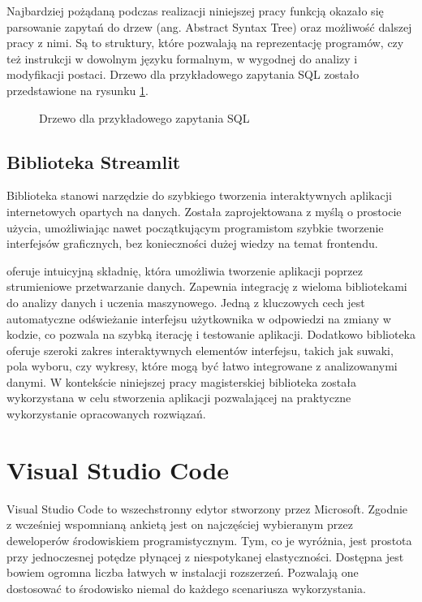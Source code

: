 Najbardziej pożądaną podczas realizacji niniejszej pracy funkcją okazało się parsowanie zapytań do drzew  (ang. Abstract Syntax Tree) oraz możliwość dalszej pracy z nimi. Są to struktury, które pozwalają na reprezentację programów, czy też instrukcji w dowolnym języku formalnym, w wygodnej do analizy i modyfikacji postaci. Drzewo  dla przykładowego zapytania SQL zostało przedstawione na rysunku \ref{fig:sql-ast-example}.

\begin{figure}[ht!]
  \centering
  
  \caption{Drzewo  dla przykładowego zapytania SQL}
  \label{fig:sql-ast-example}
\end{figure}

\subsection{Biblioteka Streamlit}
Biblioteka  stanowi narzędzie do szybkiego tworzenia interaktywnych aplikacji internetowych opartych na danych. Została zaprojektowana z myślą o prostocie użycia, umożliwiając nawet początkującym programistom szybkie tworzenie interfejsów graficznych, bez konieczności dużej wiedzy na temat frontendu. 

 oferuje intuicyjną składnię, która umożliwia tworzenie aplikacji poprzez strumieniowe przetwarzanie danych. Zapewnia integrację z wieloma bibliotekami do analizy danych i uczenia maszynowego. Jedną z kluczowych cech  jest automatyczne odświeżanie interfejsu użytkownika w odpowiedzi na zmiany w kodzie, co pozwala na szybką iterację i testowanie aplikacji. Dodatkowo biblioteka oferuje szeroki zakres interaktywnych elementów interfejsu, takich jak suwaki, pola wyboru, czy wykresy, które mogą być łatwo integrowane z analizowanymi danymi. W kontekście niniejszej pracy magisterskiej biblioteka  została wykorzystana w celu stworzenia aplikacji pozwalającej na praktyczne wykorzystanie opracowanych rozwiązań.

\section{Visual Studio Code}
Visual Studio Code to wszechstronny edytor stworzony przez Microsoft. Zgodnie z wcześniej wspomnianą ankietą   jest on najczęściej wybieranym przez deweloperów środowiskiem programistycznym. Tym, co je wyróżnia, jest prostota przy jednoczesnej potędze płynącej z niespotykanej elastyczności. Dostępna jest bowiem ogromna liczba łatwych w instalacji rozszerzeń. Pozwalają one dostosować to środowisko niemal do każdego scenariusza wykorzystania.


